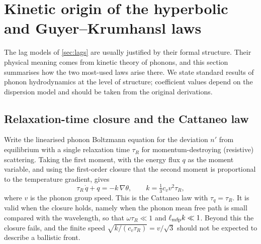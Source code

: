 \section{Kinetic origin of the hyperbolic and Guyer--Krumhansl laws}\label{sec:kinetic}

The lag models of \cref{sec:lags} are usually justified by their formal structure. Their physical meaning comes from kinetic theory of phonons, and this section summarises how the two most-used laws arise there. We state standard results of phonon hydrodynamics at the level of structure; coefficient values depend on the dispersion model and should be taken from the original derivations.

\subsection{Relaxation-time closure and the Cattaneo law}
Write the linearised phonon Boltzmann equation for the deviation $n'$ from equilibrium with a single relaxation time $\tau_R$ for momentum-destroying (resistive) scattering. Taking the first moment, with the energy flux $q$ as the moment variable, and using the first-order closure that the second moment is proportional to the temperature gradient, gives
\begin{equation}\label{eq:cattkin}
\tau_R\,\dot q+q=-k\,\nabla\theta,\qquad k=\tfrac13 c_v v^2\tau_R ,
\end{equation}
where $v$ is the phonon group speed. This is the Cattaneo law with $\tau_q=\tau_R$. It is valid when the closure holds, namely when the phonon mean free path is small compared with the wavelength, so that $\omega\tau_R\ll1$ and $\ell_{\rm mfp}k\ll1$. Beyond this the closure fails, and the finite speed $\sqrt{k/(c_v\tau_R)}=v/\sqrt3$ should not be expected to describe a ballistic front.

